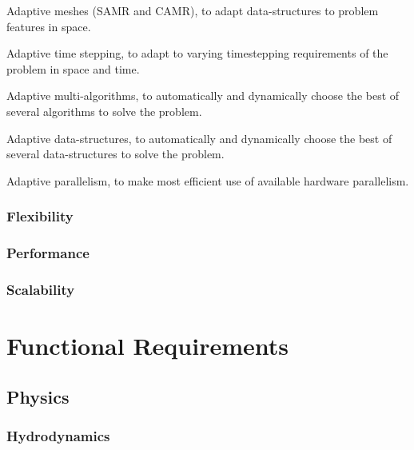 \documentclass{article}
\begin{document}
   Adaptive meshes (SAMR and CAMR), to adapt data-structures to problem
   features in space.

   Adaptive time stepping, to adapt to varying timestepping
   requirements of the problem in space and time.

   Adaptive multi-algorithms, to automatically and dynamically choose
   the best of several algorithms to solve the problem.

   Adaptive data-structures, to automatically and dynamically choose
   the best of several data-structures to solve the problem.

   Adaptive parallelism, to make most efficient use of available
   hardware parallelism.



\subsubsection{Flexibility}

\subsubsection{Performance}

\subsubsection{Scalability}

\section{Functional Requirements}

\subsection{Physics}

\subsubsection{Hydrodynamics}
\end{document}
